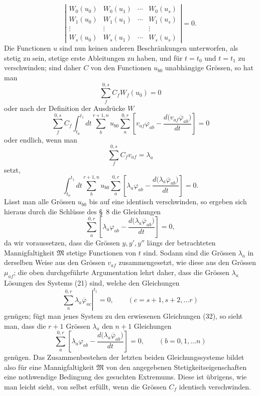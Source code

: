 \documentclass[11pt,a4paper,leqno]{article}
\begin{document}
\[
\left|
\begin{matrix}
W_0(u_0)&W_0(u_1)&\cdots&W_0(u_s)\\
W_1(u_0)&W_1(u_1)&\cdots&W_1(u_s)\\
\vdots&\vdots&&\vdots\\
W_s(u_0)&W_s(u_1)&\cdots&W_s(u_s)
\end{matrix}
\right|=0.
\]
Die Functionen $u$ sind nun keinen anderen Beschränkungen unterworfen, als stetig zu sein, stetige erste Ableitungen zu haben, und für $t=t_0$ und $t=t_1$ zu verschwinden; sind daher $C$ von den Functionen $u_{b0}$ unabhängige Grössen, so hat man
\[
\sum_f^{0,s}C_fW_f(u_0)=0
\]
oder nach der Definition der Ausdrücke $W$
\[
\sum_f^{0,s}C_f
\int_{t_0}^{t_1}dt\sum_b^{r+1,n}u_{b0}\sum_a^{0,r}
\left[
v_{af}\varphi_{ab}-\frac{d\bigl(v_{af}\overline{\varphi}_{ab}\bigr)}{dt}
\right]=0
\]
oder endlich, wenn man
\[
\sum_f^{0,s}C_fv_{af}=\lambda_a
\]
setzt,
\[
\int_{t_0}^{t_1}dt\sum_b^{r+1,n}u_{b0}\sum_a^{0,r}
\left[
\lambda_a\varphi_{ab}-\frac{d\bigl(\lambda_a\overline{\varphi}_{ab}\bigr)}{dt}
\right]=0.
\]
Lässt man alle Grössen $u_{b0}$ bis auf eine identisch verschwinden, so ergeben sich hieraus durch die Schlüsse des \S~8 die Gleichungen
\begin{equation}\tag{32}
\sum_a^{0,r}
\left[
\lambda_a\varphi_{ab}-\frac{d\bigl(\lambda_a\overline{\varphi}_{ab}\bigr)}{dt}
\right]=0,
\end{equation}
da wir voraussetzen, dass die Grössen $y,y',y''$ längs der betrachteten Mannigfaltigkeit $\mathfrak M$ stetige Functionen von $t$ sind. Sodann sind die Grössen $\lambda_a$ in derselben Weise aus den Grössen $v_{af}$ zusammengesetzt, wie diese aus den Grössen $\mu_{af}$; die oben durchgeführte Argumentation lehrt daher, dass die Grössen $\lambda_a$ Lösungen des Systems (21) sind, welche den Gleichungen
\begin{equation}\tag{33}
\left.\sum_a^{0,r}\lambda_a\overline{\varphi}_{ac}\right|^{t_1}=0,
\qquad(c=s+1,s+2,\ldots r)
\end{equation}
genügen; fügt man jenes System zu den erwiesenen Gleichungen (32), so sieht man, dass die $r+1$ Grössen $\lambda_a$ den $n+1$ Gleichungen
\begin{equation}\tag{34}
\sum_a^{0,r}
\left[
\lambda_a\varphi_{ab}-\frac{d\bigl(\lambda_a\overline{\varphi}_{ab}\bigr)}{dt}
\right]=0,
\qquad(b=0,1,\ldots n)
\end{equation}
genügen. Das Zusammenbestehen der letzten beiden Gleichungssysteme bildet also für eine Mannigfaltigkeit $\mathfrak M$ von den angegebenen Stetigkeitseigenschaften eine nothwendige Bedingung des gesuchten Extremums. Diese ist übrigens, wie man leicht sieht, von selbst erfüllt, wenn die Grössen $C_f$ identisch verschwinden.
\end{document}
